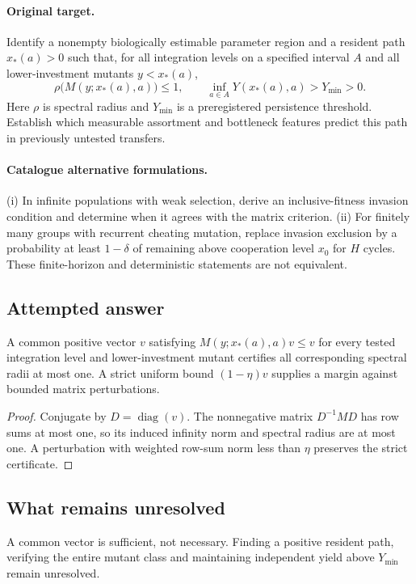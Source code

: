 \documentclass[11pt]{article}
\begin{document}
\paragraph{Original target.}
Identify a nonempty biologically estimable parameter region and a resident path $x_*(a)>0$ such that, for all integration levels on a specified interval $A$ and all lower-investment mutants $y<x_*(a)$,
\[
 \rho\bigl(M(y;x_*(a),a)\bigr)\le1,
 \qquad \inf_{a\in A}Y(x_*(a),a)>Y_{\min}>0.
\]
Here $\rho$ is spectral radius and $Y_{\min}$ is a preregistered persistence threshold. Establish which measurable assortment and bottleneck features predict this path in previously untested transfers.
\paragraph{Catalogue alternative formulations.}
(i) In infinite populations with weak selection, derive an inclusive-fitness invasion condition and determine when it agrees with the matrix criterion. (ii) For finitely many groups with recurrent cheating mutation, replace invasion exclusion by a probability at least $1-\delta$ of remaining above cooperation level $x_0$ for $H$ cycles. These finite-horizon and deterministic statements are not equivalent.
\subsection{Attempted answer}
\begin{proposition}
A common positive vector $v$ satisfying $M(y;x_*(a),a)v\leq v$ for every tested integration level and lower-investment mutant certifies all corresponding spectral radii at most one. A strict uniform bound $(1-\eta)v$ supplies a margin against bounded matrix perturbations.
\end{proposition}
\begin{proof}
Conjugate by $D=\operatorname{diag}(v)$. The nonnegative matrix $D^{-1}MD$ has row sums at most one, so its induced infinity norm and spectral radius are at most one. A perturbation with weighted row-sum norm less than $\eta$ preserves the strict certificate.
\end{proof}
\subsection{What remains unresolved}
A common vector is sufficient, not necessary. Finding a positive resident path, verifying the entire mutant class and maintaining independent yield above $Y_{\min}$ remain unresolved.
\end{document}
